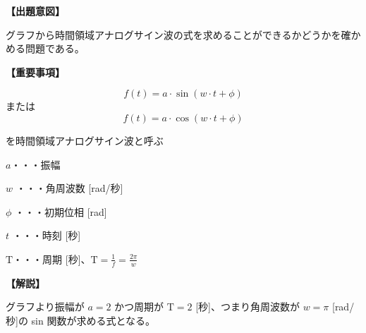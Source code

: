 \noindent \textbf{【出題意図】}

\noindent グラフから時間領域アナログサイン波の式を求めることができるかどうかを確かめる問題である。

\vspace{1em}
\noindent \textbf{【重要事項】}

\[
f(t) = a \cdot \sin( w \cdot t + \phi )
\]
%
\noindent または
%
\[
f(t) = a \cdot \cos( w \cdot t + \phi )
\]

\medskip
\noindent を時間領域アナログサイン波と呼ぶ

\bigskip
\noindent $a$・・・振幅

\bigskip
\noindent $w$ ・・・角周波数 [rad/秒]

\bigskip
\noindent $\phi$ ・・・初期位相 [rad]

\bigskip
\noindent $t$ ・・・時刻 [秒]

\bigskip
$\textrm{T}$・・・周期 [秒]、$\textrm{T} = \frac{1}{f} = \frac{2\pi}{w}$

\vspace{1em}
\noindent \textbf{【解説】}

\noindent グラフより振幅が $a = 2$ かつ周期が $\textrm{T} = 2$ [秒]、つまり角周波数が $w = \pi$ [rad/秒]の sin 関数が求める式となる。
